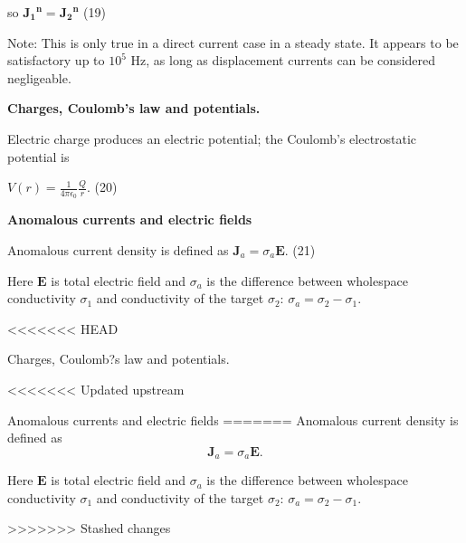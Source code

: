 \documentclass[11pt,letterpaper,leqno]{amsart}
\numberwithin{equation}{section}
\begin{document}
so $\mathbf{{J_1}^n={J_2}^n}$ \quad (19)

\vspace{0.4cm}
Note: This is only true in a direct current case in a steady state. It appears to be satisfactory up to $10^5$ Hz, as long as displacement currents can be considered negligeable.

\vspace{0.4cm}

\Large
\textbf{Charges, Coulomb's law and potentials.}

Electric charge produces an electric potential; the Coulomb's electrostatic potential is

$V(r) = \frac{1}{4\pi\epsilon_0}\frac{Q}{r}.$ \quad (20)

 \vspace{0.4cm}



\Large
\textbf{Anomalous currents and electric fields}

Anomalous current density is defined as 
$\mathbf{J}_a = \sigma_a\mathbf{E}.$ \quad (21)


Here $\mathbf{E}$ is total electric field and $\sigma_a$ is the difference between wholespace conductivity $\sigma_1$ and conductivity of the target $\sigma_2$: $\sigma_a = \sigma_2-\sigma_1$.



 \vspace{0.4cm}

<<<<<<< HEAD
 \vspace{0.4cm}

Charges, Coulomb?s law and potentials.

<<<<<<< Updated upstream
 \vspace{0.4cm}

Anomalous currents and electric fields
=======
Anomalous current density is defined as 
\begin{equation*}
\mathbf{J}_a = \sigma_a\mathbf{E}.
\end{equation*}

Here $\mathbf{E}$ is total electric field and $\sigma_a$ is the difference between wholespace conductivity $\sigma_1$ and conductivity of the target $\sigma_2$: $\sigma_a = \sigma_2-\sigma_1$.

>>>>>>> Stashed changes
\end{document}
